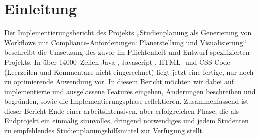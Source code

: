 \section{Einleitung}
Der Implementierungsbericht des Projekts „Studienplanung als Generierung von Workflows mit Compliance-Anforderungen: Planerstellung und Visualisierung“ beschreibt die Umsetzung des zuvor im Pflichtenheft und Entwurf spezifizierten Projekts. In über 14000~Zeilen Java-, Javascript-, HTML- und CSS-Code (Leerzeilen und Kommentare nicht eingerechnet) liegt jetzt eine fertige, nur noch zu optimierende Anwendung vor. In diesem Bericht möchten wir dabei auf implementierte und ausgelassene Features eingehen, Änderungen beschreiben und begründen, sowie die Implementierungsphase reflektieren.
Zusammenfassend ist dieser Bericht Ende einer arbeitsintensiven, aber erfolgreichen Phase, die als Endprojekt ein einmalig sinnvolles, dringend notwendiges und jedem Studenten zu empfehlendes Studienplanungshilfsmittel zur Verfügung stellt.

